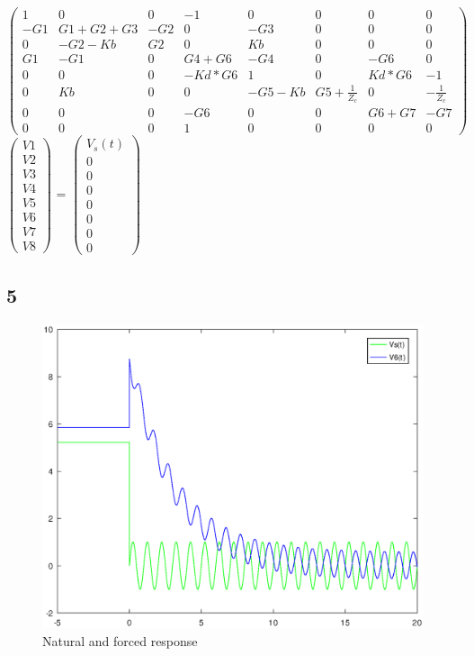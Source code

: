 $\begin{pmatrix}
1 & 0 & 0 & -1 & 0 & 0 & 0 & 0\\
-G1 & G1+G2+G3 & -G2 & 0 & -G3 & 0 & 0 & 0\\
0 & -G2-Kb & G2 & 0 & Kb & 0 & 0 & 0 \\
G1 & -G1 & 0 & G4+G6 & -G4 & 0 & -G6 & 0\\
0 & 0 & 0 & -Kd*G6 & 1 & 0 & Kd*G6 & -1 \\
0 & Kb & 0 & 0 & -G5-Kb & G5+\frac{1}{Z_c} & 0 & -\frac{1}{Z_c} \\
0 & 0 & 0 & -G6 & 0 & 0 & G6+G7 & -G7  \\ 
0 & 0 & 0 & 1 & 0 & 0 & 0 & 0
\end{pmatrix}$
$\begin{pmatrix}
V1\\
V2\\
V3\\
V4\\
V5\\
V6\\
V7\\
V8
\end{pmatrix}$
=
$\begin{pmatrix}
V_s(t)\\
0\\
0\\
0\\
0\\
0\\
0\\
0
\end{pmatrix}$

\subsection{5}

\begin{figure}[H]
\centering
\includegraphics[width = 15cm]{Solution.eps}
\caption {Natural and forced response}
\end{figure}

